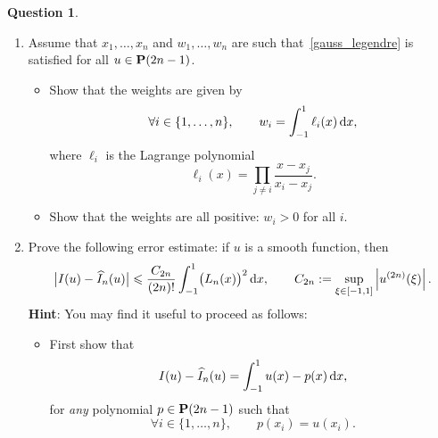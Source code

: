 \documentclass[11pt]{article}
\theoremstyle{definition}
\newtheorem{question}{Question}
\begin{document}
\begin{question}
\begin{enumerate}
        \item
            Assume that $x_1, \dotsc, x_n$ and $w_1, \dotsc, w_n$ are such that~\eqref{gauss_legendre} is satisfied for all $u \in \mathbf P(2n-1)$.
            \begin{itemize}

                \item
                    Show that the weights are given by
                    \[
                        \forall i \in \{1, \dotsc, n\}, \qquad
                        w_i = \int_{-1}^{1} \ell_i(x) \, \mathrm d x,
                    \]
                    where $\ell_i$ is the Lagrange polynomial
                    \[
                        \ell_i(x) = \prod_{j \neq i} \frac{x - x_j}{x_i - x_j}.
                    \]

                \item
                    Show that the weights are all positive: $w_i > 0$ for all $i$.
            \end{itemize}

                \newpage
                \item
                     Prove the following error estimate:
                    if $u$ is a smooth function,
                    then
                    \[
                         \bigl\lvert I(u) - \widehat I_n(u) \bigr\rvert
                         \leqslant \frac{C_{2n}}{(2n)!}\int_{-1}^1 \bigl(L_n(x)\bigr)^2 \, \mathrm d x,
                         \qquad C_{2n} := \sup_{\xi \in [-1, 1]} \left\lvert u^{(2n)}(\xi) \right\rvert.
                    \]
                    \textbf{Hint}: You may find it useful to proceed as follows:
                    \begin{itemize}
                        \item
                            First show that
                            \begin{equation}
                                \label{eq:hermite_interpolation}
                                 I(u) - \widehat I_n(u)
                                = \int_{-1}^{1} u(x) - p(x) \, \mathrm d x,
                            \end{equation}
                            for \emph{any} polynomial $p \in \mathbf P(2n-1)$ such that
                            \[
                                \forall i \in \{1, \dotsc, n\}, \qquad
                                p(x_i) = u(x_i).
                            \]


\end{itemize}
\end{enumerate}
\end{question}
\end{document}

